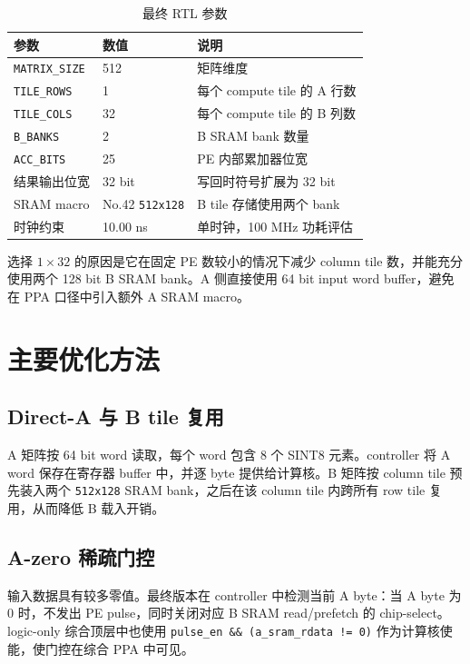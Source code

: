 \documentclass[UTF8,a4paper,zihao=-4]{ctexart}
\begin{document}
\begin{table}[H]
\centering
\caption{最终 RTL 参数}
\begin{tabular}{lll}
\toprule
参数 & 数值 & 说明 \\
\midrule
\texttt{MATRIX\_SIZE} & 512 & 矩阵维度 \\
\texttt{TILE\_ROWS} & 1 & 每个 compute tile 的 A 行数 \\
\texttt{TILE\_COLS} & 32 & 每个 compute tile 的 B 列数 \\
\texttt{B\_BANKS} & 2 & B SRAM bank 数量 \\
\texttt{ACC\_BITS} & 25 & PE 内部累加器位宽 \\
结果输出位宽 & 32 bit & 写回时符号扩展为 32 bit \\
SRAM macro & No.42 \texttt{512x128} & B tile 存储使用两个 bank \\
时钟约束 & 10.00 ns & 单时钟，100 MHz 功耗评估 \\
\bottomrule
\end{tabular}
\end{table}

选择 $1\times32$ 的原因是它在固定 PE 数较小的情况下减少 column tile 数，并能充分使用两个 128 bit B SRAM bank。A 侧直接使用 64 bit input word buffer，避免在 PPA 口径中引入额外 A SRAM macro。

\section{主要优化方法}

\subsection{Direct-A 与 B tile 复用}

A 矩阵按 64 bit word 读取，每个 word 包含 8 个 SINT8 元素。controller 将 A word 保存在寄存器 buffer 中，并逐 byte 提供给计算核。B 矩阵按 column tile 预先装入两个 \texttt{512x128} SRAM bank，之后在该 column tile 内跨所有 row tile 复用，从而降低 B 载入开销。

\subsection{A-zero 稀疏门控}

输入数据具有较多零值。最终版本在 controller 中检测当前 A byte：当 A byte 为 0 时，不发出 PE pulse，同时关闭对应 B SRAM read/prefetch 的 chip-select。logic-only 综合顶层中也使用 \texttt{pulse\_en \&\& (a\_sram\_rdata != 0)} 作为计算核使能，使门控在综合 PPA 中可见。
\end{document}
